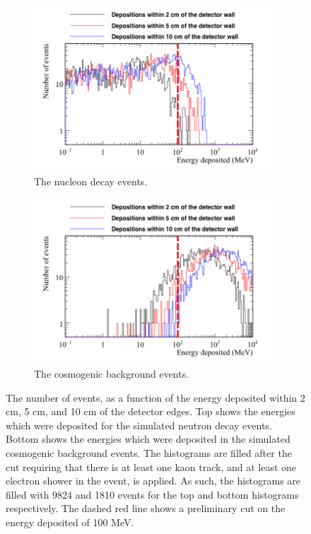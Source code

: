 \begin{figure}[h!]
  \centering
  \begin{subfigure}{0.75\textwidth}
    \centering
    \includegraphics[width=\textwidth]{NucleonDecay_EDepNearEdges}
    \caption{The nucleon decay events.}
  \end{subfigure}
  \begin{subfigure}{0.75\textwidth}
    \centering
    \includegraphics[width=\textwidth]{CosmicBackground_EDepNearEdges}
    \caption{The cosmogenic background events.}
  \end{subfigure}
  \caption[The number of events, as a function of the energy deposited within 2 cm, 5 cm, and 10 cm of the detector edges.]
          {The number of events, as a function of the energy deposited within 2 cm, 5 cm, and 10 cm of the detector edges. Top shows the energies which were deposited for the simulated neutron decay events. Bottom shows the energies which were deposited in the simulated cosmogenic background events. The histograms are filled after the cut requiring that there is at least one kaon track, and at least one electron shower in the event, is applied. As such, the histograms are filled with 9824 and 1810 events for the top and bottom histograms respectively. The dashed red line shows a preliminary cut on the energy deposited of 100 MeV.}
  \label{fig:NDK_EDepNearEdge}
\end{figure}

